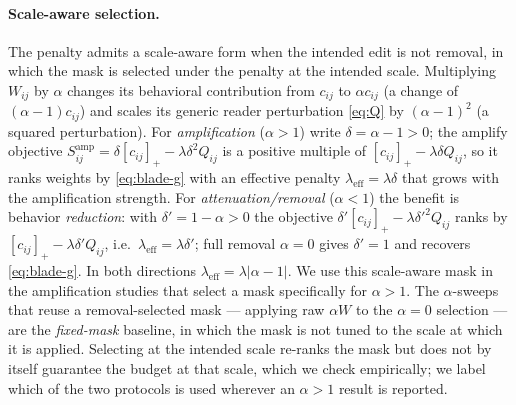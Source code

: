 \paragraph{Scale-aware selection.} The penalty admits a scale-aware form when the intended edit is not removal, in which the mask is selected under the penalty at the intended scale. Multiplying $W_{ij}$ by $\alpha$ changes its behavioral contribution from $c_{ij}$ to $\alpha c_{ij}$ (a change of $(\alpha-1)c_{ij}$) and scales its generic reader perturbation \eqref{eq:Q} by $(\alpha-1)^2$ (a squared perturbation). For \emph{amplification} ($\alpha>1$) write $\delta=\alpha-1>0$; the amplify objective $S^{\mathrm{amp}}_{ij}=\delta[c_{ij}]_+-\lambda\delta^2 Q_{ij}$ is a positive multiple of $[c_{ij}]_+-\lambda\delta Q_{ij}$, so it ranks weights by \eqref{eq:blade-g} with an effective penalty $\lambda_{\mathrm{eff}}=\lambda\delta$ that grows with the amplification strength. For \emph{attenuation/removal} ($\alpha<1$) the benefit is behavior \emph{reduction}: with $\delta'=1-\alpha>0$ the objective $\delta'[c_{ij}]_+-\lambda\delta'^2 Q_{ij}$ ranks by $[c_{ij}]_+-\lambda\delta' Q_{ij}$, i.e.\ $\lambda_{\mathrm{eff}}=\lambda\delta'$; full removal $\alpha=0$ gives $\delta'=1$ and recovers \eqref{eq:blade-g}. In both directions $\lambda_{\mathrm{eff}}=\lambda\lvert\alpha-1\rvert$. We use this scale-aware mask in the amplification studies that select a mask specifically for $\alpha>1$. The $\alpha$-sweeps that reuse a removal-selected mask --- applying raw $\alpha W$ to the $\alpha=0$ selection --- are the \emph{fixed-mask} baseline, in which the mask is not tuned to the scale at which it is applied. Selecting at the intended scale re-ranks the mask but does not by itself guarantee the budget at that scale, which we check empirically; we label which of the two protocols is used wherever an $\alpha>1$ result is reported.

